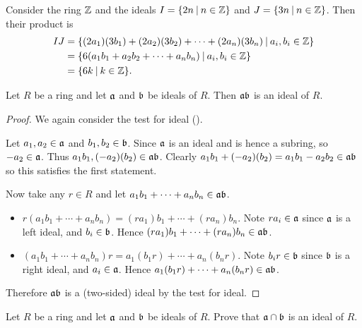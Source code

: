 \begin{example}
    Consider the ring $\mathbb{Z}$ and the ideals $I = \{2n \vert n \in \Z\}$ and $J = \{3n \vert n \in \Z\}$. Then their product is
    \begin{align*}
        IJ &= \{(2a_1)(3b_1) + (2a_2)(3b_2) + \cdots + (2a_n)(3b_n) \vert a_i,b_i \in \Z\}\\
        &= \{6(a_1b_1 + a_2b_2 + \cdots + a_nb_n) \vert a_i,b_i \in \Z\}\\
        &= \{6k \vert k \in \Z\}.
    \end{align*}
\end{example}
\begin{proposition}
    Let $R$ be a ring and let $\mathfrak{a}$ and $\mathfrak{b}$ be ideals of $R$. Then $\mathfrak{ab}$ is an ideal of $R$.
\end{proposition}
\begin{proof}
    We again consider the test for ideal ().

    Let $a_1,a_2 \in \mathfrak{a}$ and $b_1,b_2 \in \mathfrak{b}$. Since $\mathfrak{a}$ is an ideal and is hence a subring, so $-a_2 \in \mathfrak{a}$. Thus $a_1b_1, (-a_2)(b_2) \in \mathfrak{ab}$. Clearly $a_1b_1 + (-a_2)(b_2) = a_1b_1 - a_2b_2 \in \mathfrak{ab}$ so this satisfies the first statement.

    Now take any $r \in R$ and let $a_1b_1 + \cdots + a_nb_n \in \mathfrak{ab}$.
    \begin{itemize}
        \item $r(a_1b_1 + \cdots + a_nb_n) = (ra_1)b_1 + \cdots + (ra_n)b_n$. Note $ra_i \in \mathfrak{a}$ since $\mathfrak{a}$ is a left ideal, and $b_i \in \mathfrak{b}$. Hence $(ra_1)b_1 + \cdots + (ra_n)b_n \in \mathfrak{ab}$.
        \item $(a_1b_1 + \cdots + a_nb_n)r = a_1(b_1r) + \cdots + a_n(b_nr)$. Note $b_ir \in \mathfrak{b}$ since $\mathfrak{b}$ is a right ideal, and $a_i \in \mathfrak{a}$. Hence $a_1(b_1r) + \cdots + a_n(b_nr) \in \mathfrak{ab}$.
    \end{itemize}

    Therefore $\mathfrak{ab}$ is a (two-sided) ideal by the test for ideal.
\end{proof}

\begin{exercise}
    Let $R$ be a ring and let $\mathfrak{a}$ and $\mathfrak{b}$ be ideals of $R$. Prove that $\mathfrak{a} \cap \mathfrak{b}$ is an ideal of $R$.
\end{exercise}


